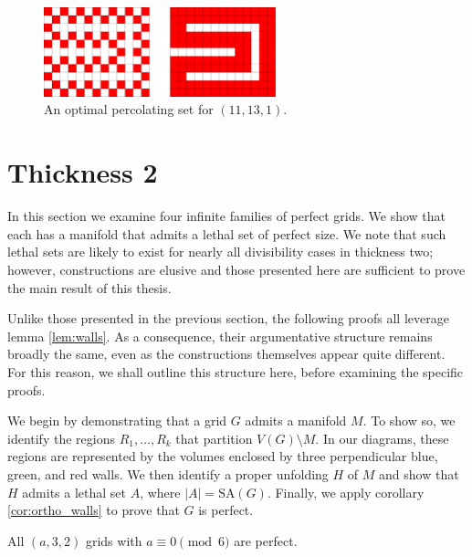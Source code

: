 \begin{figure}[]
\centering
\includegraphics[width=0.6\textwidth]{figures/7/11x13x1.pdf}
\caption{An optimal percolating set for $(11,13,1)$.}
\label{fig:11x13x1}
\end{figure} 


\section{Thickness 2}

In this section we examine four infinite families of perfect grids. We show that each has a manifold that admits a lethal set of perfect size. We note that such lethal sets are likely to exist for nearly all divisibility cases in thickness two; however, constructions are elusive and those presented here are sufficient to prove the main result of this thesis.

Unlike those presented in the previous section, the following proofs all leverage lemma \ref{lem:walls}. As a consequence, their argumentative structure remains broadly the same, even as the constructions themselves appear quite different. For this reason, we shall outline this structure here, before examining the specific proofs. 

We begin by demonstrating that a grid $G$ admits a manifold $M$. To show so, we identify the regions $R_1, \dots, R_k$ that partition $V(G) \setminus M$. In our diagrams, these regions are represented by the volumes enclosed by three perpendicular blue, green, and red walls. We then identify a proper unfolding $H$ of $M$ and show that $H$ admits a lethal set $A$, where $|A| = \text{SA}(G)$. Finally, we apply corollary \ref{cor:ortho_walls} to prove that $G$ is perfect. 

\begin{con}
All $(a,3,2)$ grids with $a \equiv 0 \pmod 6$ are perfect. 
\end{con}


